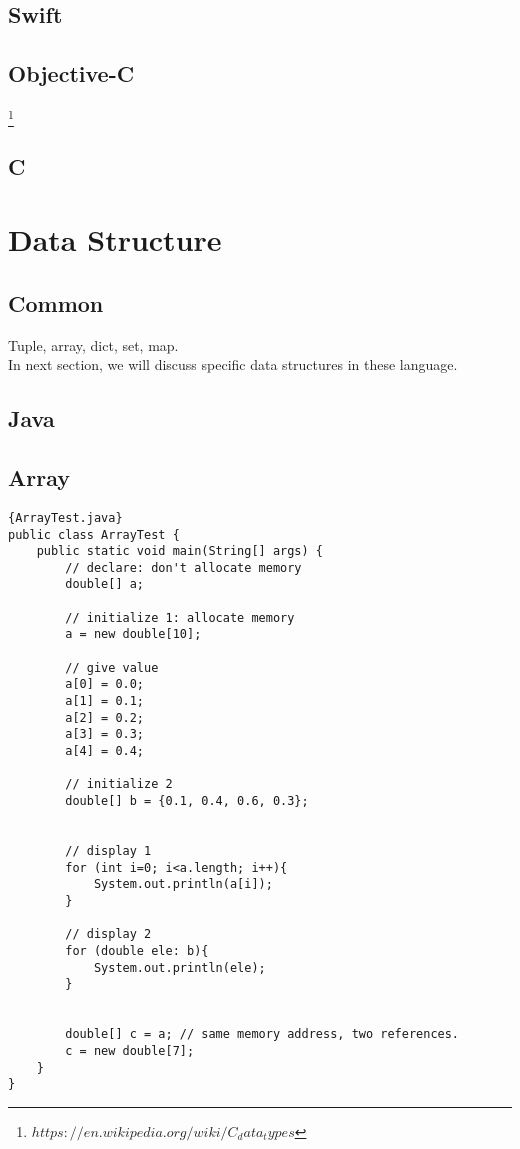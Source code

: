 \documentclass[12pt, a4pape]{article}
\begin{document}
	\subsection{Swift}
	
	\subsection{Objective-C}
	\footnote{$https://en.wikipedia.org/wiki/C_data_types$}
	\subsection{C}
	
	
\section{Data Structure}
	\subsection{Common}
	Tuple, array, dict, set, map. \\
	
	In next section, we will discuss specific data structures in these language.
	\subsection{Java}
		\subsection{Array}
		\begin{lstlisting}{ArrayTest.java}
public class ArrayTest {
    public static void main(String[] args) {
        // declare: don't allocate memory
        double[] a;

        // initialize 1: allocate memory
        a = new double[10];

        // give value
        a[0] = 0.0;
        a[1] = 0.1;
        a[2] = 0.2;
        a[3] = 0.3;
        a[4] = 0.4;

        // initialize 2
        double[] b = {0.1, 0.4, 0.6, 0.3};


        // display 1
        for (int i=0; i<a.length; i++){
            System.out.println(a[i]);
        }

        // display 2
        for (double ele: b){
            System.out.println(ele);
        }


        double[] c = a; // same memory address, two references.
        c = new double[7]; 
    }
}
		\end{lstlisting}
		
\end{document}
